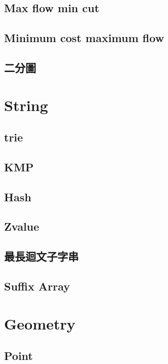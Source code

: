 \subsection{Max flow min cut} 

\subsection{Minimum cost maximum flow} 

\subsection{二分圖} 


\section{String}
\subsection{trie} 

\subsection{KMP} 

\subsection{Hash} 

\subsection{Zvalue} 

\subsection{最長迴文子字串} 

\subsection{Suffix Array} 


\section{Geometry}
\subsection{Point} 

